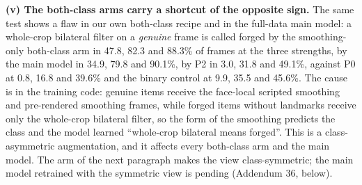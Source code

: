 \textbf{(v) The both-class arms carry a shortcut of the opposite sign.} The same test shows a flaw in our own both-class
recipe and in the full-data main model: a whole-crop bilateral filter on a \emph{genuine} frame is called forged by the
smoothing-only both-class arm in 47.8, 82.3 and 88.3\% of frames at the three strengths, by the main model in 34.9, 79.8
and 90.1\%, by P2 in 3.0, 31.8 and 49.1\%, against P0 at 0.8, 16.8 and 39.6\% and the binary control at 9.9, 35.5 and
45.6\%. The cause is in the training code: genuine items receive the face-local scripted smoothing and pre-rendered
smoothing frames, while forged items without landmarks receive only the whole-crop bilateral filter, so the form of the
smoothing predicts the class and the model learned ``whole-crop bilateral means forged''. This is a class-asymmetric
augmentation, and it affects every both-class arm and the main model. The arm of the next paragraph makes the view
class-symmetric; the main model retrained with the symmetric view is pending (Addendum 36, below).

